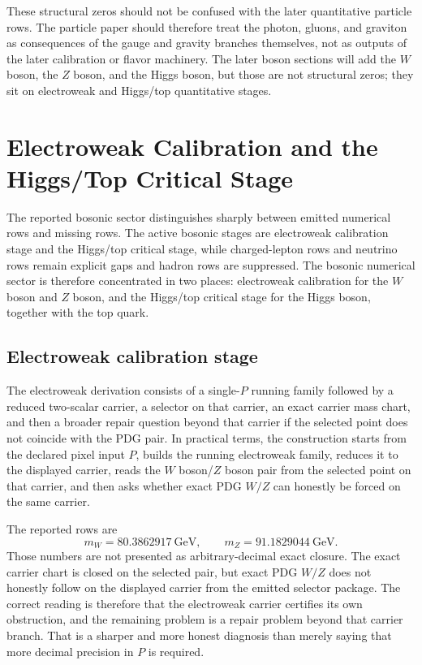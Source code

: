 \documentclass[11pt]{article}
\begin{document}
These structural zeros should not be confused with the later quantitative particle rows. The
particle paper should therefore treat the photon, gluons, and graviton as consequences of the
gauge and gravity branches themselves, not as outputs of the later calibration or flavor
machinery. The later boson sections will add the \(W\) boson, the \(Z\) boson, and the Higgs
boson, but those are not structural zeros; they sit on electroweak and Higgs/top quantitative stages.

\section{Electroweak Calibration and the Higgs/Top Critical Stage}

The reported bosonic sector distinguishes sharply between emitted numerical rows and
missing rows. The active bosonic stages are electroweak
calibration stage and the Higgs/top critical stage, while charged-lepton rows
and neutrino rows remain explicit gaps and hadron rows are suppressed. The bosonic numerical
sector is therefore concentrated in two places: electroweak calibration for the \(W\) boson and \(Z\) boson, and
the Higgs/top critical stage for the Higgs boson, together with the top quark.

\subsection{Electroweak calibration stage}

The electroweak derivation consists of a single-\(P\) running family followed by a
reduced two-scalar carrier, a selector on that carrier, an exact carrier mass chart, and
then a broader repair question beyond that carrier if the selected point does not
coincide with the PDG pair. In practical terms, the construction starts from
the declared pixel input \(P\), builds the running electroweak family, reduces it to the displayed
carrier, reads the \(W\) boson/\(Z\) boson pair from the selected point on that carrier,
and then asks whether exact PDG \(W/Z\) can honestly be forced on the same carrier.

The reported rows are
\[
m_W = 80.3862917~\mathrm{GeV},
\qquad
m_Z = 91.1829044~\mathrm{GeV}.
\]
Those numbers are not presented as arbitrary-decimal exact closure. The exact carrier
chart is closed on the selected pair, but exact PDG \(W/Z\) does not honestly follow on the displayed carrier from the emitted selector
package. The correct reading is therefore that the electroweak carrier certifies
its own obstruction, and the remaining problem is a repair problem beyond that
carrier branch. That is a sharper and more honest diagnosis than merely saying that more
decimal precision in \(P\) is required.
\end{document}
